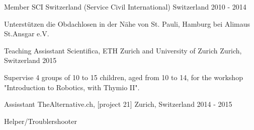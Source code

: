 

\begin{cventries}

  \cventry
    {Member} %
    {SCI Switzerland (Service Civil International)} %
    {Switzerland} %
    {2010 - 2014} %
    {
      \begin{cvitems} %
        \item {Unterstützen die Obdachlosen in der Nähe von St. Pauli, Hamburg bei Alimaus St.Ansgar e.V.}
      \end{cvitems}
    }

  \cventry
    {Teaching Assisstant} %
    {Scientifica, ETH Zurich and University of Zurich} %
    {Zurich, Switzerland} %
    {2015} %
    {
      \begin{cvitems} %
        \item {Supervise 4 groups of 10 to 15 children, aged from 10 to 14, for the workshop "Introduction to Robotics, with Thymio II".}
      \end{cvitems}
    }

  \cventry
    {Assisstant} %
    {TheAlternative.ch, [project 21]} %
    {Zurich, Switzerland} %
    {2014 - 2015} %
    {
      \begin{cvitems} %
        \item {Helper/Troublershooter}
      \end{cvitems}
    }


\end{cventries}
